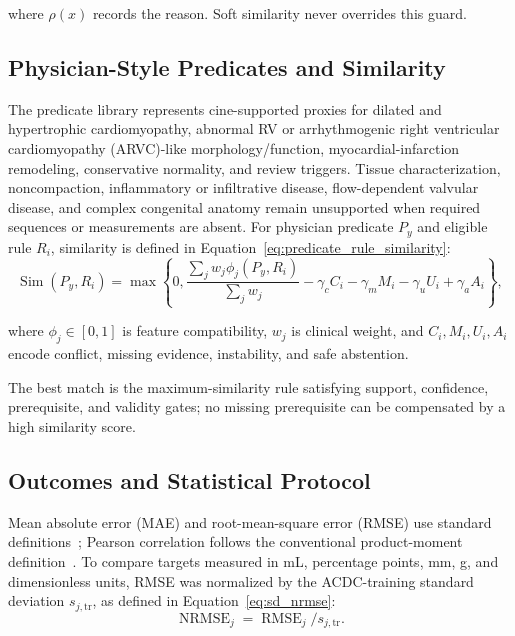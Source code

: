 \documentclass{ceurart}
\begin{document}
where \(\rho(x)\) records the reason. Soft similarity never overrides this guard.

\subsection{Physician-Style Predicates and Similarity}\label{subsec:physician_predicates_similarity}

The predicate library represents cine-supported proxies for dilated and hypertrophic cardiomyopathy, abnormal RV or arrhythmogenic right ventricular cardiomyopathy (ARVC)-like morphology/function, myocardial-infarction remodeling, conservative normality, and review triggers. Tissue characterization, noncompaction, inflammatory or infiltrative disease, flow-dependent valvular disease, and complex congenital anatomy remain unsupported when required sequences or measurements are absent. For physician predicate \(P_y\) and eligible rule \(R_i\), similarity is defined in Equation~\eqref{eq:predicate_rule_similarity}:
\begin{equation}
\operatorname{Sim}(P_y,R_i)=\max\!\left\{0,
\frac{\sum_jw_j\phi_j(P_y,R_i)}{\sum_jw_j}
-\gamma_cC_i-\gamma_mM_i-\gamma_uU_i+\gamma_aA_i\right\},
\label{eq:predicate_rule_similarity}
\end{equation}

where \(\phi_j\in[0,1]\) is feature compatibility, \(w_j\) is clinical weight, and \(C_i,M_i,U_i,A_i\) encode conflict, missing evidence, instability, and safe abstention.

The best match is the maximum-similarity rule satisfying support, confidence, prerequisite, and validity gates; no missing prerequisite can be compensated by a high similarity score.

\subsection{Outcomes and Statistical Protocol}\label{subsec:outcomes_statistical_protocol}

Mean absolute error (MAE) and root-mean-square error (RMSE) use standard definitions~\cite{Willmott2005Advantages}; Pearson correlation follows the conventional product-moment definition~\cite{Benesty2009Pearson}. To compare targets measured in mL, percentage points, mm, g, and dimensionless units, RMSE was normalized by the ACDC-training standard deviation \(s_{j,\mathrm{tr}}\), as defined in Equation~\eqref{eq:sd_nrmse}:
\begin{equation}
\operatorname{NRMSE}_j=\operatorname{RMSE}_j/s_{j,\mathrm{tr}} .
\label{eq:sd_nrmse}
\end{equation}
\end{document}
